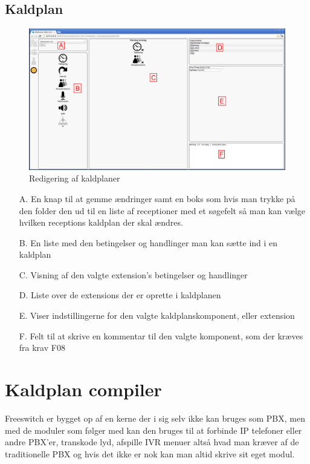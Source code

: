 \pagebreak
\subsection{Kaldplan}
\begin{figure}[ht!]
\centering
\includegraphics[width=\textwidth]{images/screen_dialplan.png}
\caption{Redigering af kaldplaner}
\label{fig:screendialplan}
\end{figure}
\begin{enumerate}
	\item[A.] {En knap til at gemme ændringer samt en boks som hvis man trykke på den folder den ud til en liste af receptioner med et søgefelt så man kan vælge hvilken receptions kaldplan der skal ændres.}
	\item[B.] {En liste med den betingelser og handlinger man kan sætte ind i en kaldplan}
	\item[C.] {Visning af den valgte extension's betingelser og handlinger}
	\item[D.] {Liste over de extensions der er oprette i kaldplanen}
	\item[E.] {Viser indstillingerne for den valgte kaldplanskomponent, eller extension}
	\item[F.] {Felt til at skrive en kommentar til den valgte komponent, som der kræves fra krav F08}
\end{enumerate}

\pagebreak
\section{Kaldplan compiler}
Freeswitch er bygget op af en kerne der i sig selv ikke kan bruges som PBX, men med de moduler som følger med kan den bruges til at forbinde IP telefoner eller andre PBX'er, transkode lyd, afspille IVR menuer altså hvad man kræver af de traditionelle PBX og hvis det ikke er nok kan man altid skrive sit eget modul.

